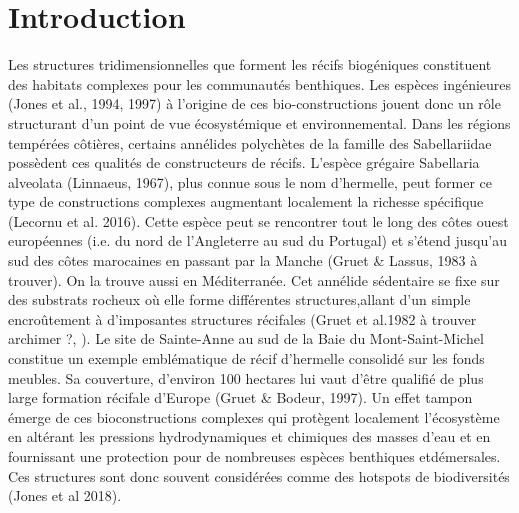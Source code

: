 
    \chapter{Introduction}
Les structures tridimensionnelles que forment les récifs biogéniques constituent des habitats complexes pour les communautés benthiques. Les espèces ingénieures (Jones et al., 1994, 1997) à l’origine de ces bio-constructions jouent donc un rôle structurant d’un point de vue écosystémique et environnemental. Dans les régions tempérées côtières, certains annélides polychètes de la famille des Sabellariidae possèdent ces qualités de constructeurs de récifs. L’espèce grégaire Sabellaria alveolata (Linnaeus, 1967), plus connue sous le nom d’hermelle, peut former ce type de constructions complexes augmentant localement la richesse spécifique (Lecornu et al. 2016). Cette espèce peut se rencontrer tout le long des côtes ouest européennes (i.e. du nord de l’Angleterre au sud du Portugal) et s’étend jusqu’au sud des côtes marocaines en passant par la Manche (Gruet & Lassus, 1983 à trouver). On la trouve aussi en Méditerranée. Cet annélide sédentaire se fixe sur des substrats rocheux où elle forme différentes structures,allant d’un simple encroûtement à d’imposantes structures récifales (Gruet et al.1982 à trouver archimer ?, ). Le site de Sainte-Anne au sud de la Baie du Mont-Saint-Michel constitue un exemple emblématique de récif d’hermelle consolidé sur les fonds meubles. Sa couverture, d’environ 100 hectares lui vaut d’être qualifié de plus large formation récifale d’Europe (Gruet & Bodeur, 1997). Un effet tampon émerge de ces bioconstructions complexes qui protègent localement l’écosystème en altérant les pressions hydrodynamiques et chimiques des masses d’eau et en fournissant une protection pour de nombreuses espèces benthiques etdémersales. Ces structures sont donc souvent considérées comme des hotspots de biodiversités (Jones et al 2018).  
